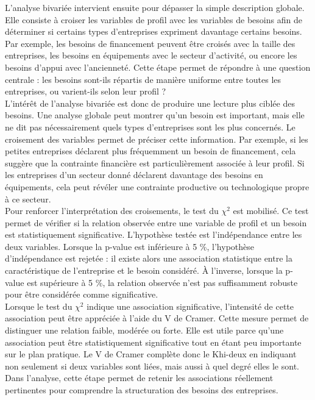 \documentclass[12pt, a4paper, oneside]{report}
\begin{document}
\begin{enumerate}
L’analyse bivariée intervient ensuite pour dépasser la simple description globale. Elle consiste à croiser les variables de profil avec les variables de besoins afin de déterminer si certains types d’entreprises expriment davantage certains besoins. Par exemple, les besoins de financement peuvent être croisés avec la taille des entreprises, les besoins en équipements avec le secteur d’activité, ou encore les besoins d’appui avec l’ancienneté. Cette étape permet de répondre à une question centrale : les besoins sont-ils répartis de manière uniforme entre toutes les entreprises, ou varient-ils selon leur profil ?\\

L’intérêt de l’analyse bivariée est donc de produire une lecture plus ciblée des besoins. Une analyse globale peut montrer qu’un besoin est important, mais elle ne dit pas nécessairement quels types d’entreprises sont les plus concernés. Le croisement des variables permet de préciser cette information. Par exemple, si les petites entreprises déclarent plus fréquemment un besoin de financement, cela suggère que la contrainte financière est particulièrement associée à leur profil. Si les entreprises d’un secteur donné déclarent davantage des besoins en équipements, cela peut révéler une contrainte productive ou technologique propre à ce secteur.\\

Pour renforcer l’interprétation des croisements, le test du $\chi^2$ est mobilisé. Ce test permet de vérifier si la relation observée entre une variable de profil et un besoin est statistiquement significative. L’hypothèse testée est l’indépendance entre les deux variables. Lorsque la p-value est inférieure à 5 \%, l’hypothèse d’indépendance est rejetée : il existe alors une association statistique entre la caractéristique de l’entreprise et le besoin considéré. À l’inverse, lorsque la p-value est supérieure à 5 \%, la relation observée n’est pas suffisamment robuste pour être considérée comme significative.\\

Lorsque le test du $\chi^2$ indique une association significative, l’intensité de cette association peut être appréciée à l’aide du V de Cramer. Cette mesure permet de distinguer une relation faible, modérée ou forte. Elle est utile parce qu’une association peut être statistiquement significative tout en étant peu importante sur le plan pratique. Le V de Cramer complète donc le Khi-deux en indiquant non seulement si deux variables sont liées, mais aussi à quel degré elles le sont. Dans l’analyse, cette étape permet de retenir les associations réellement pertinentes pour comprendre la structuration des besoins des entreprises.
	\end{enumerate}
\end{document}

